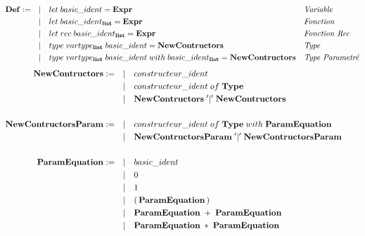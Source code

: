 \documentclass[
  12pt,
]{article}
\begin{document}
\begin{align*}
  \bf{Def} := \quad & |\quad let \; basic\_ident = \bf{Expr}                                                                        &  & \textit{Variable}       \\
                    & |\quad let \; basic\_ident_{\bf{list}} = \bf{Expr}                                                            &  & \textit{Fonction}       \\
                    & |\quad let \; rec \; basic\_ident_{\bf{list}} = \bf{Expr}                                                     &  & \textit{Fonction Rec}   \\
                    & |\quad type \; vartype_{\bf{list}} \; basic\_ident =  \bf{NewContructors}                                     &  & \textit{Type}           \\
                    & |\quad type \; vartype_{\bf{list}} \; basic\_ident \; with \; basic\_ident_{\bf{list}} =  \bf{NewContructors} &  & \textit{Type Parametré}
\end{align*} \begin{align*}
  \bf{NewContructors} :=   \quad       & |\quad  constructeur\_ident                                                            \\
                                       & |\quad  constructeur\_ident \;of\; \textbf{Type}                                       \\
                                       & |\quad  \textbf{NewContructors} \;'|'\; \textbf{NewContructors}                        \\
  \\
  \bf{NewContructorsParam} :=    \quad & |\quad constructeur\_ident \;of\; \textbf{Type} \; with \; \textbf{ParamEquation}      \\
                                       & |\quad  \textbf{NewContructorsParam} \;'|'\; \textbf{NewContructorsParam}         &  & \\
  \\
  \bf{ParamEquation} := \quad          & |\quad basic\_ident                                                                    \\
                                       & |\quad 0                                                                               \\
                                       & |\quad 1                                                                               \\
                                       & |\quad (\,\textbf{ParamEquation}\,)                                                    \\
                                       & |\quad \textbf{ParamEquation} \; + \; \textbf{ParamEquation}                           \\
                                       & |\quad \textbf{ParamEquation} \; * \; \textbf{ParamEquation}                           \\
\end{align*}
\end{document}
